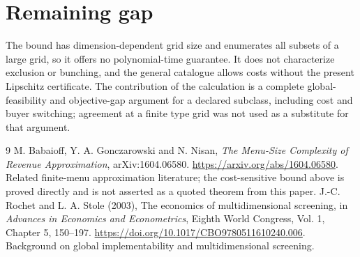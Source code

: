 \documentclass[11pt]{article}
\theoremstyle{definition}
\theoremstyle{remark}
\begin{document}
\section{Remaining gap}
The bound has dimension-dependent grid size and enumerates all subsets of a large grid, so it offers no polynomial-time guarantee. It does not characterize exclusion or bunching, and the general catalogue allows costs without the present Lipschitz certificate. The contribution of the calculation is a complete global-feasibility and objective-gap argument for a declared subclass, including cost and buyer switching; agreement at a finite type grid was not used as a substitute for that argument.

\begin{thebibliography}{9}
 M. Babaioff, Y. A. Gonczarowski and N. Nisan, \emph{The Menu-Size Complexity of Revenue Approximation}, arXiv:1604.06580. \url{https://arxiv.org/abs/1604.06580}. Related finite-menu approximation literature; the cost-sensitive bound above is proved directly and is not asserted as a quoted theorem from this paper.
 J.-C. Rochet and L. A. Stole (2003), The economics of multidimensional screening, in \emph{Advances in Economics and Econometrics}, Eighth World Congress, Vol. 1, Chapter 5, 150--197. \url{https://doi.org/10.1017/CBO9780511610240.006}. Background on global implementability and multidimensional screening.
\end{thebibliography}
\end{document}
